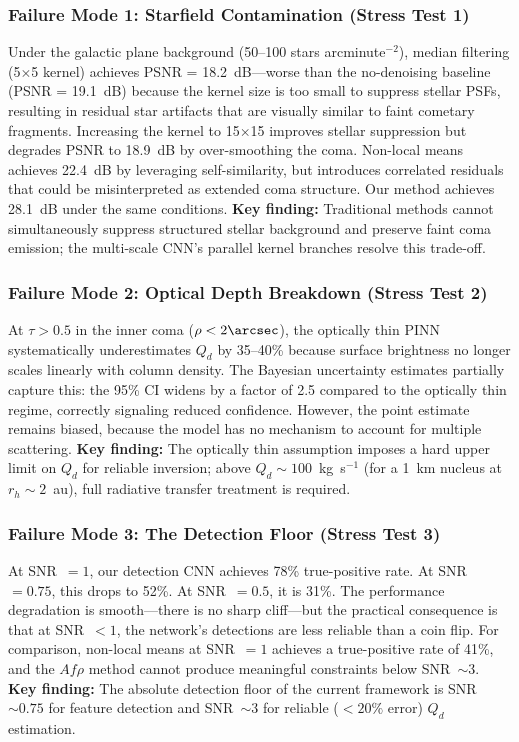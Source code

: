 \documentclass[usenatbib]{mnras}
\begin{document}
\subsubsection{Failure Mode 1: Starfield Contamination (Stress Test 1)}

Under the galactic plane background (50--100 stars arcminute$^{-2}$), median filtering (5$\times$5 kernel) achieves PSNR = 18.2~dB---worse than the no-denoising baseline (PSNR = 19.1~dB) because the kernel size is too small to suppress stellar PSFs, resulting in residual star artifacts that are visually similar to faint cometary fragments. Increasing the kernel to 15$\times$15 improves stellar suppression but degrades PSNR to 18.9~dB by over-smoothing the coma. Non-local means achieves 22.4~dB by leveraging self-similarity, but introduces correlated residuals that could be misinterpreted as extended coma structure. Our method achieves 28.1~dB under the same conditions. \textbf{Key finding:} Traditional methods cannot simultaneously suppress structured stellar background and preserve faint coma emission; the multi-scale CNN's parallel kernel branches resolve this trade-off.

\subsubsection{Failure Mode 2: Optical Depth Breakdown (Stress Test 2)}

At $\tau > 0.5$ in the inner coma ($\rho < 2\arcsec$), the optically thin PINN systematically underestimates $Q_d$ by 35--40\% because surface brightness no longer scales linearly with column density. The Bayesian uncertainty estimates partially capture this: the 95\% CI widens by a factor of 2.5 compared to the optically thin regime, correctly signaling reduced confidence. However, the point estimate remains biased, because the model has no mechanism to account for multiple scattering. \textbf{Key finding:} The optically thin assumption imposes a hard upper limit on $Q_d$ for reliable inversion; above $Q_d \sim 100$~kg~s$^{-1}$ (for a 1~km nucleus at $r_h \sim 2$~au), full radiative transfer treatment is required.

\subsubsection{Failure Mode 3: The Detection Floor (Stress Test 3)}

At SNR~$=1$, our detection CNN achieves 78\% true-positive rate. At SNR~$=0.75$, this drops to 52\%. At SNR~$=0.5$, it is 31\%. The performance degradation is smooth---there is no sharp cliff---but the practical consequence is that at SNR~$<1$, the network's detections are less reliable than a coin flip. For comparison, non-local means at SNR~$=1$ achieves a true-positive rate of 41\%, and the $Af\rho$ method cannot produce meaningful constraints below SNR~$\sim 3$. \textbf{Key finding:} The absolute detection floor of the current framework is SNR~$\sim 0.75$ for feature detection and SNR~$\sim 3$ for reliable ($<20\%$ error) $Q_d$ estimation.
\end{document}
